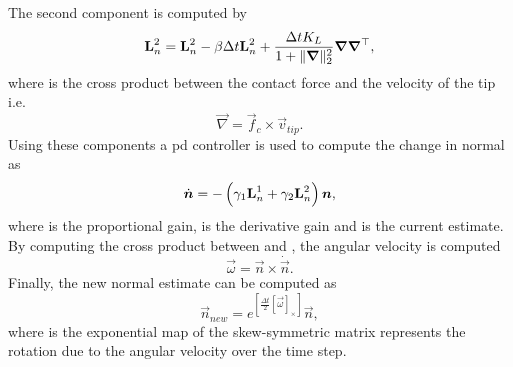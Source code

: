 The second component  is computed by
%
\begin{equation} \label{eq:def-L-2}
	\bm{\mathrm{L}}_n^2 = \bm{\mathrm{L}}_n^2 - \beta \Delta t \bm{\mathrm{L}}_n^2 + \frac{\Delta t K_L}{1+
	\|\bm{\nabla}\|_2^2} \bm{\nabla} \bm{\nabla}^\top,
\end{equation}
where  is the cross product between the contact force  and the velocity of the tip  i.e.
%
\begin{equation} \label{eq:def-nabla-rls}
	\vec{\nabla} = \vec{f}_c \times \vec{v}_{tip}.
\end{equation}
Using these components a \gls{pd} controller is used to compute the change in normal  as 
%
\begin{equation} \label{eq:def-n-dot}
	\dot{\bm{n}} = -\left( \gamma_1 \bm{\mathrm{L}}_n^1 + \gamma_2 \bm{\mathrm{L}}_n^2 \right)\bm{n},
\end{equation}
where \mvar{\gamma_1\inR{}} is the proportional gain, \mvar{\gamma_2\inR{}} is the derivative gain and  is the current estimate. By computing the cross product between  and , the angular velocity \mvar{\vec{\omega}} is computed
%
\begin{equation} \label{eq:omega-from-n-and-n-dot}
	\vec{\omega} = \vec{n} \times \dot{\vec{n}}.
\end{equation}
Finally, the new normal estimate  can be computed as
%
\begin{equation}
	\vec{n}_{new} = e^{ \left[ \frac{\Delta t }{2} [\vec{\omega}]_\times \right]} \vec{n},
\end{equation}
where  is the exponential map of the skew-symmetric matrix represents the rotation due to the angular velocity over the time step.

